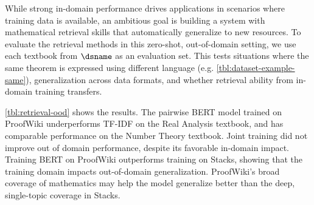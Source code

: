 \begin{table}[t!]
\setlength{\tabcolsep}{4pt}
\begin{center}
\end{center}
\caption{\textit{Zero-shot} retrieval performance on out-of-domain textbooks.
}
\label{tbl:retrieval-ood}
\end{table}
While strong in-domain performance drives applications in scenarios where training data is available, an ambitious goal is building a system with mathematical retrieval skills that automatically generalize to new resources.
To evaluate the retrieval methods in this zero-shot, out-of-domain setting, we use each textbook from $\dsname$ as an evaluation set.
This tests situations where the same theorem is expressed using different language (e.g. \autoref{tbl:dataset-example-same}), generalization across data formats, and whether retrieval ability from in-domain training transfers.

\autoref{tbl:retrieval-ood} shows the results. 
The pairwise BERT model trained on ProofWiki underperforms TF-IDF on the Real Analysis textbook, and has comparable performance on the Number Theory textbook.
Joint training did not improve out of domain performance, despite its favorable in-domain impact.
Training BERT on ProofWiki outperforms training on Stacks, showing that the training domain impacts out-of-domain generalization. 
ProofWiki's broad coverage of mathematics may help the model generalize better than the deep, single-topic coverage in Stacks.

